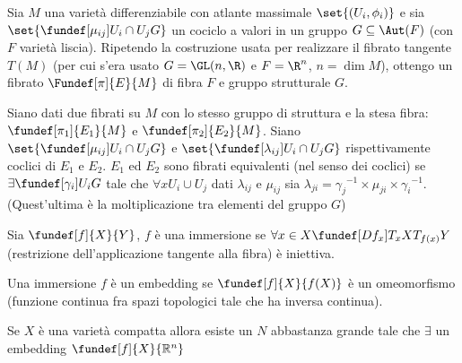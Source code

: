 
\newcommand*\dual{{^\ast}} %


Sia $M$ una varietà differenziabile con atlante massimale $\set{(U_i, \phi_i)}$ e sia $\set{ \fundef[\mu_{ij}]{U_i \cap U_j}{G} }$ un cociclo a valori in un gruppo $G \subseteq \Aut(F)$ (con $F$ varietà liscia). Ripetendo la costruzione usata per realizzare il fibrato tangente $T(M)$ (per cui s'era usato $G = \GL(n, \R)$ e $F=\R^n$, $n = \dim M$), ottengo un fibrato $\Fundef[\pi]{E}{M}$ di fibra $F$ e gruppo strutturale $G$.

\begin{defn}
Siano dati due fibrati su $M$ con lo stesso gruppo di struttura e la stesa fibra: $\fundef[\pi_1]{E_1}{M}$ e  $\fundef[\pi_2]{E_2}{M}$.
Siano $\set{ \fundef[\mu_{ij}]{U_i \cap U_j}{G} }$ e $\set{ \fundef[\lambda_{ij}]{U_i \cap U_j}{G} }$ rispettivamente coclici di $E_1$ e $E_2$.
$E_1$ ed $E_2$ sono fibrati equivalenti (nel senso dei coclici) se $\exists \fundef[\gamma_{i}]{U_i}{G}$ tale che $\forall x U_i \cup U_j$ dati $\lambda_{ij}$ e $\mu_{ij}$
sia $\lambda_{ji} = {\gamma_j}^{-1} \times \mu_{ji} \times  {\gamma_i}^{-1}$.  (Quest'ultima è la moltiplicazione tra elementi del gruppo $G$)
\end{defn}

\begin{defn}
Sia $\fundef[f]{X}{Y}$, $f$ è una immersione se $\forall x \in X \fundef[Df_{x}]{T_{x}X}{T_{f(x)} Y}$ (restrizione dell'applicazione tangente alla fibra) è iniettiva.
\end{defn}

\begin{defn}[Embedding] 
 Una immersione $f$ è un embedding se $\fundef[f]{X}{f(X)}$  è un omeomorfismo (funzione continua fra spazi topologici tale che ha inversa continua).
\end{defn}



\begin{teo}
 Se $X$ è una varietà compatta allora esiste un $N$ abbastanza grande tale che $\exists$ un embedding $\fundef[f]{X}{\mathbb{R}^{n}}$
\end{teo}


